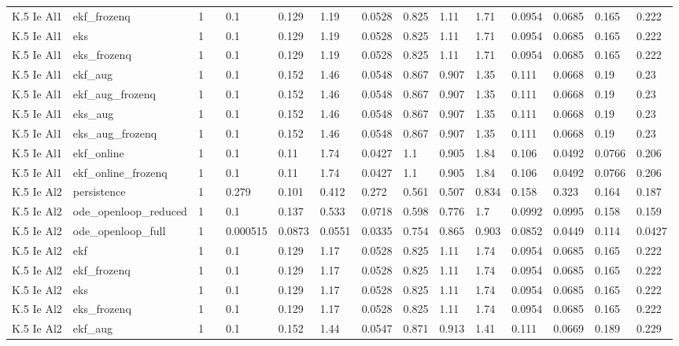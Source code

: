 \begin{table}[t]
\begin{tabular}{lllllllllllllll}
K.5 Ie Al1 & ekf\_frozenq & 1 &  & 0.1 & 0.129 & 1.19 & 0.0528 & 0.825 & 1.11 & 1.71 & 0.0954 & 0.0685 & 0.165 & 0.222 \\
K.5 Ie Al1 & eks & 1 &  & 0.1 & 0.129 & 1.19 & 0.0528 & 0.825 & 1.11 & 1.71 & 0.0954 & 0.0685 & 0.165 & 0.222 \\
K.5 Ie Al1 & eks\_frozenq & 1 &  & 0.1 & 0.129 & 1.19 & 0.0528 & 0.825 & 1.11 & 1.71 & 0.0954 & 0.0685 & 0.165 & 0.222 \\
K.5 Ie Al1 & ekf\_aug & 1 &  & 0.1 & 0.152 & 1.46 & 0.0548 & 0.867 & 0.907 & 1.35 & 0.111 & 0.0668 & 0.19 & 0.23 \\
K.5 Ie Al1 & ekf\_aug\_frozenq & 1 &  & 0.1 & 0.152 & 1.46 & 0.0548 & 0.867 & 0.907 & 1.35 & 0.111 & 0.0668 & 0.19 & 0.23 \\
K.5 Ie Al1 & eks\_aug & 1 &  & 0.1 & 0.152 & 1.46 & 0.0548 & 0.867 & 0.907 & 1.35 & 0.111 & 0.0668 & 0.19 & 0.23 \\
K.5 Ie Al1 & eks\_aug\_frozenq & 1 &  & 0.1 & 0.152 & 1.46 & 0.0548 & 0.867 & 0.907 & 1.35 & 0.111 & 0.0668 & 0.19 & 0.23 \\
K.5 Ie Al1 & ekf\_online & 1 &  & 0.1 & 0.11 & 1.74 & 0.0427 & 1.1 & 0.905 & 1.84 & 0.106 & 0.0492 & 0.0766 & 0.206 \\
K.5 Ie Al1 & ekf\_online\_frozenq & 1 &  & 0.1 & 0.11 & 1.74 & 0.0427 & 1.1 & 0.905 & 1.84 & 0.106 & 0.0492 & 0.0766 & 0.206 \\
K.5 Ie Al2 & persistence & 1 &  & 0.279 & 0.101 & 0.412 & 0.272 & 0.561 & 0.507 & 0.834 & 0.158 & 0.323 & 0.164 & 0.187 \\
K.5 Ie Al2 & ode\_openloop\_reduced & 1 &  & 0.1 & 0.137 & 0.533 & 0.0718 & 0.598 & 0.776 & 1.7 & 0.0992 & 0.0995 & 0.158 & 0.159 \\
K.5 Ie Al2 & ode\_openloop\_full & 1 &  & 0.000515 & 0.0873 & 0.0551 & 0.0335 & 0.754 & 0.865 & 0.903 & 0.0852 & 0.0449 & 0.114 & 0.0427 \\
K.5 Ie Al2 & ekf & 1 &  & 0.1 & 0.129 & 1.17 & 0.0528 & 0.825 & 1.11 & 1.74 & 0.0954 & 0.0685 & 0.165 & 0.222 \\
K.5 Ie Al2 & ekf\_frozenq & 1 &  & 0.1 & 0.129 & 1.17 & 0.0528 & 0.825 & 1.11 & 1.74 & 0.0954 & 0.0685 & 0.165 & 0.222 \\
K.5 Ie Al2 & eks & 1 &  & 0.1 & 0.129 & 1.17 & 0.0528 & 0.825 & 1.11 & 1.74 & 0.0954 & 0.0685 & 0.165 & 0.222 \\
K.5 Ie Al2 & eks\_frozenq & 1 &  & 0.1 & 0.129 & 1.17 & 0.0528 & 0.825 & 1.11 & 1.74 & 0.0954 & 0.0685 & 0.165 & 0.222 \\
K.5 Ie Al2 & ekf\_aug & 1 &  & 0.1 & 0.152 & 1.44 & 0.0547 & 0.871 & 0.913 & 1.41 & 0.111 & 0.0669 & 0.189 & 0.229 \\

\end{tabular}
\end{table}
